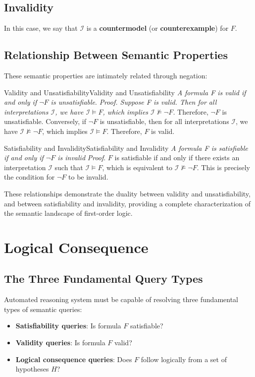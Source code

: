 \documentclass[a4paper]{article}
\theoremstyle{definition}
\begin{document}
\subsection{Invalidity}
In this case, we say that \( \mathcal{I} \) is a \textbf{countermodel} (or \textbf{counterexample}) for \( F \).
\subsection{Relationship Between Semantic Properties}
These semantic properties are intimately related through negation:
\begin{theorem}{Validity and Unsatisfiability}{Validity and Unsatisfiability}
\textit{A formula F is valid if and only if \( \lnot F \) is unsatisfiable}.
\vspace{1em}
\noindent
\newline
\textit{Proof. Suppose  F is valid. Then for all interpretations \( \mathcal{I} \), we have \( \mathcal{I} \models F \), which implies \( \mathcal{I} \nvDash \lnot F \).}
\newline
Therefore, \( \lnot F \) is unsatisfiable.
\vspace{1em}
\noindent
\newline
Conversely, if \( \lnot F \) is unsatisfiable, then for all interpretations \( \mathcal{I} \), we have \( \mathcal{I} \nvDash \lnot F \), which implies 
\( \mathcal{I} \models F \). Therefore, \( F \) is valid.
\end{theorem}
\begin{theorem}{Satisfiability and Invalidity}{Satisfiability and Invalidity}
\textit{A formula F is satisfiable if and only if \( \lnot F \) is invalid}
\vspace{1em}
\noindent
\newline
\textit{Proof}. \( F \) is satisfiable if and only if there exists an interpretation \( \mathcal{I} \) such that \( \mathcal{I} \models F \), which 
is equivalent to \( \mathcal{I} \nvDash \lnot F \). This is precisely the condition for \( \lnot F \) to be invalid.
\end{theorem}
These relationships demonstrate the duality between validity and unsatisfiability, and between 
satisfiability and invalidity, providing a complete characterization of the semantic landscape of first-order logic.
\section{Logical Consequence}
\subsection{The Three Fundamental Query Types}
Automated reasoning system must be capable of resolving three fundamental types of semantic queries:
\begin{itemize}
	\item \textbf{Satisfiability queries}: Is formula \( F \) satisfiable?
	\item \textbf{Validity queries}: Is formula \( F \) valid?
	\item \textbf{Logical consequence queries}: Does \( F \) follow logically from a set of hypotheses \( H \)?
\end{itemize}
\end{document}
